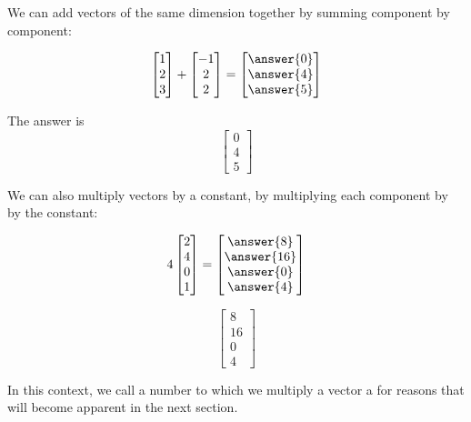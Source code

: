 \documentclass{ximera}
\begin{document}
We can add vectors of the same dimension together by summing component by component:

\begin{question}
		\[
	\begin{bmatrix} 1 \\ 2 \\3  \end{bmatrix}+ \begin{bmatrix} -1\\ 2 \\ 2  \end{bmatrix} = \begin{bmatrix} \answer{0} \\ \answer{4} \\ \answer{5}  \end{bmatrix}
	\]
	
	\begin{hint}
		The answer is  
		\[
		\begin{bmatrix} 0 \\ 4 \\ 5 \end{bmatrix}
		\]
	\end{hint}
\end{question}

We can also multiply vectors by a constant, by multiplying each component by by the constant:

\begin{question}

\[
4\begin{bmatrix} 2 \\ 4 \\ 0  \\ 1 \end{bmatrix} = \begin{bmatrix} \answer{8}\\ \answer{16} \\ \answer{0}  \\ \answer{4} \end{bmatrix} 
\]	

\begin{hint}
\[
 \begin{bmatrix} 8 \\ 16 \\ 0  \\ 4 \end{bmatrix} 
 \]
\end{hint}
\end{question}

In this context, we call a number to which we multiply a vector a  for reasons that will become apparent in the next section.
\end{document}

